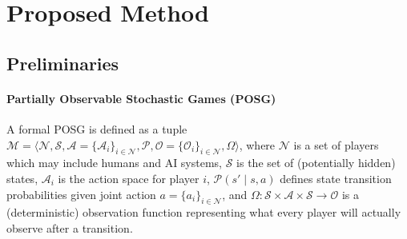 \documentclass{article}
\begin{document}

\section{Proposed Method}
\label{sec:method}

\subsection{Preliminaries}
\label{subsec:preliminaries}

\paragraph{Partially Observable Stochastic Games (POSG)}
A formal POSG is defined as a tuple $\mathcal{M} = \langle \mathcal{N}, \mathcal{S}, \mathcal{A}=\{\mathcal{A}_i\}_{i \in \mathcal{N}}, \mathcal{P}, \mathcal{O}=\{\mathcal{O}_i\}_{i \in \mathcal{N}}, \Omega \rangle$, where $\mathcal{N}$ is a set of players which may include humans and AI systems,
$\mathcal{S}$ is the set of (potentially hidden) states, $\mathcal{A}_i$ is the action space for player $i$, $\mathcal{P}(s' \mid s, a)$ defines state transition probabilities given joint action $a=\{a_i\}_{i\in\mathcal N}$, and $\Omega:\mathcal S\times\mathcal A\times\mathcal S\to\mathcal O$ is a (deterministic) observation function representing what every player will actually observe after a transition.
\end{document}

